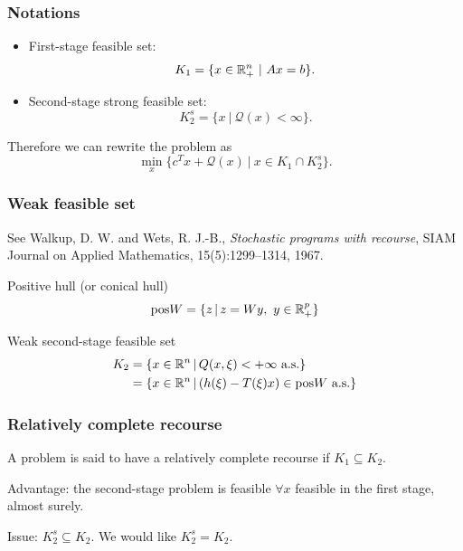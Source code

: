 \documentclass{beamer}
\begin{document}
\begin{frame}
\frametitle{Notations}

\begin{itemize}
\item
{\red First-stage feasible set}:
\[
K_1 = \lbrace x \in {\mathbb{R}}^n_+ \ |\ Ax = b \rbrace.
\]
\item
{\red Second-stage strong feasible set}:
\[
K_2^s = \lbrace x \ |\ \mathcal{Q}(x) < \infty \rbrace.
\]
\end{itemize}

\mbox{}

Therefore we can rewrite the problem as
\[
\min_x \lbrace c^Tx + \mathcal{Q}(x) \ |\ x \in K_1 \cap K_2^s \rbrace.
\]

\end{frame}

\begin{frame}
\frametitle{Weak feasible set}

See Walkup, D. W. and Wets, R. J.-B., {\it Stochastic programs with recourse}, SIAM Journal on Applied Mathematics, 15(5):1299--1314, 1967.

\mbox{}

{\red Positive hull} (or conical hull)
$$
\text{pos}W = \lbrace z \,|\, z = Wy,\ y \in {\mathbb{R}}^p_+ \rbrace
$$

\mbox{}

{\red Weak second-stage feasible set}
\begin{align*}
K_2 &= \lbrace x \in {\mathbb{R}}^n \,|\, Q(x,\xi) < +\infty \text{ a.s.} \rbrace \\
&= \lbrace x \in {\mathbb{R}}^n \,|\, (h(\xi) - T(\xi)x) \in \text{pos} W \text{ a.s.} \rbrace
\end{align*}

\end{frame}

\begin{frame}
\frametitle{Relatively complete recourse}

A problem is said to have a {\red relatively complete recourse} if $K_1
\subseteq K_2$.

\mbox{}

{\blue Advantage}: the second-stage problem is feasible $\forall x$ feasible in the first stage, almost surely.

\mbox{}

{\blue Issue}: $K_2^s \subseteq K_2$. We would like $K_2^s = K_2$.

\end{frame}
\end{document}
